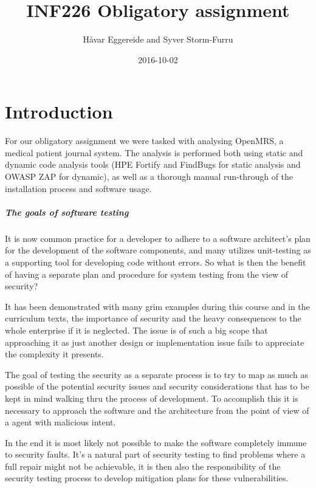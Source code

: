 \documentclass{report} %
\title{INF226 Obligatory assignment}
\date{2016-10-02}
\author{Håvar Eggereide and Syver Storm-Furru}
\begin{document}
\maketitle
{}
\newpage
{}
\tableofcontents
\newpage
\chapter{Introduction}

  For our obligatory assignment we were tasked with analysing OpenMRS, a medical
  patient journal system. The analysis is performed both using static and
  dynamic code analysis tools (HPE Fortify and FindBugs for static analysis and
  OWASP ZAP for dynamic), as well as a thorough manual run-through of the installation
  process and software usage.

  \paragraph{The goals of software testing}

  It is now common practice  for a developer to adhere to a software architect's
  plan for the development of the software components, and many utilizes
  unit-testing as a supporting tool for developing code without errors. So what
  is then the benefit of having a separate plan and procedure for system testing
  from the view of security?

  It has been demonstrated with many grim examples during this course and in the
  curriculum texts, the importance of security and the heavy consequences to the
  whole enterprise if it is neglected. The issue is of such a big scope that
  approaching it as just another design or implementation issue fails to
  appreciate the complexity it presents.

  The goal of testing the security as a separate process is to try to map as
  much as possible of the potential security issues and security considerations
  that has to be kept in mind walking thru the process of development. To
  accomplish this it is necessary to approach the software and the architecture
  from the point of view of a agent with malicious intent.

  In the end it is  most likely not possible to make the software completely
  immune to security faults. It's a natural part of security testing to find
  problems where a full repair might not be achievable, it is then also the
  responsibility of the security testing process to develop mitigation plans for
  these vulnerabilities.
\end{document}
